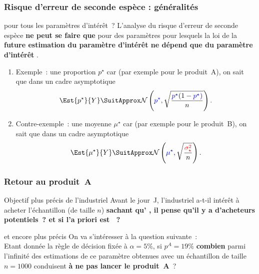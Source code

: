 \documentclass[11pt]{beamer}
\newcommand{\Sim}{{\star}}
\begin{document}
\begin{frame}
\frametitle{Risque d'erreur de seconde espèce : généralités}

\begin{exampleblock}{pour tous les paramètres d'intérêt~?}
{\small L'analyse du risque d'erreur de seconde espèce \textbf{ne peut se faire  que} pour des paramètres pour lesquels  la loi de la \textbf{future estimation du paramètre d'intérêt ne dépend que du paramètre d'intérêt} . }\pause
\begin{enumerate}
\item Exemple~: {\color{red} une proportion $p^\Sim$} car (par exemple pour le produit~A), on sait que dans un cadre asymptotique \pause
$$
\Est{p^\Sim}{Y} \SuitApprox \mathcal{N} \left( {\color{blue}p^\Sim} , \sqrt{\frac{{\color{blue}p^\Sim}(1-{\color{blue}p^\Sim)}}{n}  } \right).
$$
\item Contre-exemple~: {\color{red} une moyenne $\mu^\Sim$} car (par exemple pour le produit~B), on sait que dans un cadre asymptotique \pause 
$$
\Est{\mu^\Sim}{Y} \SuitApprox \mathcal{N} \left( {\color{blue}\mu^\Sim} , \sqrt{\frac{{\color{red}\sigma_\Sim^2}}{n}  } \right).
$$
\end{enumerate}
\end{exampleblock}
\end{frame}


\begin{frame}
\frametitle{Retour au produit~A}


\begin{exampleblock}{Objectif plus précis de l'industriel}
Avant le jour~J, l'industriel  a-t-il intérêt à acheter l'échantillon (de taille $n$) \pause 
\textbf{sachant qu' , il pense qu'il y a  d'acheteurs potentiels~? \pause et si l'a priori est ~?} \pause
\end{exampleblock}


\begin{alertblock}{et encore plus précis}
\pause On va s'intéresser à la question suivante~: \\
\pause Etant donnée la règle de décision fixée à $\alpha=5\%$, si $p^A=19\%$ \textbf{combien} parmi l'infinité des estimations de ce paramètre obtenues avec un échantillon de taille $n=1000$ conduisent \textbf{à ne pas lancer le produit~A}~? 
\end{alertblock}
\end{frame}
\end{document}
